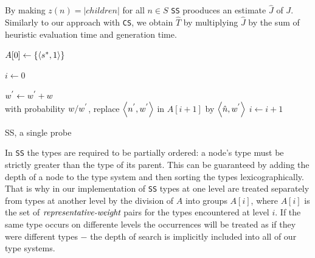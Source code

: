 By making $z(n) = |children|$ for all $n \in S$ \texttt{SS} prooduces an estimate $\hat{J}$ of $J$. Similarly to our approach with \texttt{CS}, we obtain $\hat{T}$ by multiplying $\hat{J}$ by the sum of heuristic evaluation time and generation time.


\begin{algorithm}

$A[0] \leftarrow \{\left\langle  s\sp{*},1 \right\rangle \}$

$i \leftarrow 0$

 {
	 {
		 {
			 {
				 {
				$w\sp{'} \leftarrow w\sp{'} + w$\\ 
				with probability $w/w\sp{'}$, replace $\left\langle n\sp{'}, w\sp{'} \right\rangle$ in $A[i+1]$ by $\left\langle \hat{n},w\sp{'} \right\rangle$
				} 
			}
		}
	}
	$i \leftarrow i + 1$
}
\caption{SS, a single probe}
\label{alg:ss_algorithm}
\end{algorithm}

In \texttt{SS} the types are required to be partially ordered: a node's type must be strictly greater than the type of its parent. This can be guaranteed by adding the depth of a node to the type system and then sorting the types lexicographically. That is why in our implementation of \texttt{SS} types at one level are treated separately from types at another level by the division of $A$ into groups $A[i]$, where $A[i]$ is the set of $\emph{representative-weight}$ pairs for the types encountered at level $i$. If the same type occurs on differente levels the occurrences will be treated as if they were different types $-$ the depth of search is implicitly included into all of our type systems.


